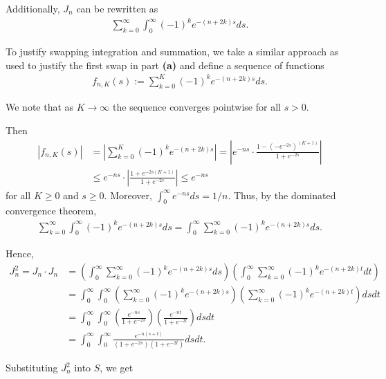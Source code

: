 \documentclass{article}
\begin{document}
\vspace{5mm}

Additionally, $J_n$ can be rewritten as
\begin{align*}
    \sum_{k=0}^{\infty}\int_{0}^{\infty}(-1)^{k}e^{-(n+2k)s}ds.
\end{align*}

To justify swapping integration and summation, we take a similar approach as used to justify the first swap in part \textbf{(a)} and define a sequence of functions
\begin{align*}
    f_{n,K}(s):=\sum_{k=0}^{K}(-1)^ke^{-(n+2k)s}ds.
\end{align*}

We note that as $K \to \infty$ the sequence converges pointwise for all $s>0$.

\vspace{5mm}

Then 
\begin{align*}
    |f_{n, K}(s)|&=\left|\sum_{k=0}^{K}(-1)^ke^{-(n+2k)s}\right| = \left|e^{-ns}\cdot\frac{1-(-e^{-2s})^{(K+1)}}{1+e^{-2s}}\right| \\ &\leq e^{-ns}\cdot\left|\frac{1+e^{-2s(K+1)}}{1+e^{-2s}}\right| \leq e^{-ns}
\end{align*}
for all $K \geq 0$ and $s \geq 0$. Moreover, $\int_0^\infty e^{-ns}ds=1/n$. Thus, by the dominated convergence theorem,
\begin{align*}
    \sum_{k=0}^{\infty}\int_{0}^{\infty}(-1)^{k}e^{-(n+2k)s}ds=\int_{0}^{\infty}\sum_{k=0}^{\infty}(-1)^{k}e^{-(n+2k)s}ds.
\end{align*}

Hence,
\begin{align*}
    J_n^2=J_n\cdot J_n&=\left(\int_{0}^{\infty}\sum_{k=0}^{\infty}(-1)^{k}e^{-(n+2k)s}ds\right)\left(\int_{0}^{\infty}\sum_{k=0}^{\infty}(-1)^{k}e^{-(n+2k)t}dt\right) \\
    &= \int_{0}^{\infty}\int_{0}^{\infty}\left(\sum_{k=0}^{\infty}(-1)^{k}e^{-(n+2k)s}\right)\left(\sum_{k=0}^{\infty}(-1)^{k}e^{-(n+2k)t}\right)dsdt \\
    &= \int_{0}^{\infty}\int_{0}^{\infty}\left(\frac{e^{-ns}}{1+e^{-2s}}\right)\left(\frac{e^{-nt}}{1+e^{-2t}}\right)dsdt \\
    &=\int_{0}^{\infty}\int_{0}^{\infty}\frac{e^{-n(s+t)}}{(1+e^{-2s})(1+e^{-2t})}dsdt.
\end{align*}

\vspace{5mm}

Substituting $J_n^2$ into $S$, we get
\end{document}

